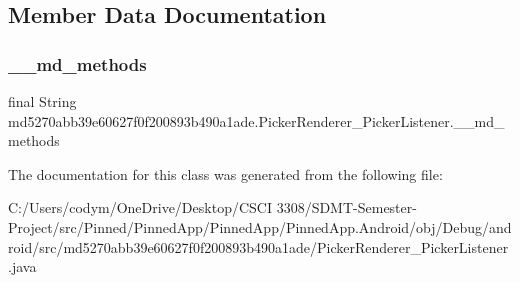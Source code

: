 \subsection{Member Data Documentation}
\mbox{\label{classmd5270abb39e60627f0f200893b490a1ade_1_1_picker_renderer___picker_listener_a0364241ced938474af94b5858f99e10d}} 
\subsubsection{\texorpdfstring{\+\_\+\+\_\+md\+\_\+methods}{\_\_md\_methods}}
{\footnotesize\ttfamily final String md5270abb39e60627f0f200893b490a1ade.\+Picker\+Renderer\+\_\+\+Picker\+Listener.\+\_\+\+\_\+md\+\_\+methods\hspace{0.3cm}{\ttfamily [static]}}



The documentation for this class was generated from the following file\+:\begin{DoxyCompactItemize}
\item 
C\+:/\+Users/codym/\+One\+Drive/\+Desktop/\+C\+S\+C\+I 3308/\+S\+D\+M\+T-\/\+Semester-\/\+Project/src/\+Pinned/\+Pinned\+App/\+Pinned\+App/\+Pinned\+App.\+Android/obj/\+Debug/android/src/md5270abb39e60627f0f200893b490a1ade/Picker\+Renderer\+\_\+\+Picker\+Listener.\+java\end{DoxyCompactItemize}
